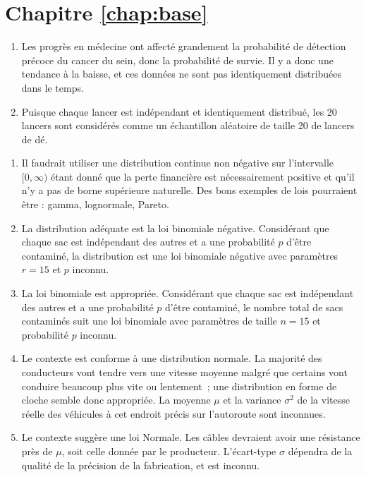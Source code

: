 \section*{Chapitre \ref{chap:base}}

\begin{solution}{1.1}
\begin{enumerate}
\item Les progrès en médecine ont affecté grandement la probabilité de détection précoce du cancer du sein, donc la probabilité de survie. Il y a donc une tendance à la baisse, et ces données ne sont pas identiquement distribuées dans le temps.
\item Puisque chaque lancer est indépendant et identiquement distribué, les 20 lancers sont considérés comme un échantillon aléatoire de taille 20 de lancers de dé.
\end{enumerate}
\end{solution}
\begin{solution}{1.2}
\begin{enumerate}
\item Il faudrait utiliser une distribution continue non négative sur l'intervalle $[0,\infty)$ étant donné que la perte financière est nécessairement positive et qu'il n'y a pas de borne supérieure naturelle. Des bons exemples de lois pourraient être : gamma, lognormale, Pareto.

\item La distribution adéquate est la loi binomiale négative. Considérant que chaque sac est indépendant des autres et a une probabilité $p$ d'être contaminé, la distribution est une loi binomiale négative avec paramètres $r=15$ et $p$ inconnu.

\item La loi binomiale est appropriée. Considérant que chaque sac est indépendant des autres et a une probabilité $p$ d'être contaminé, le nombre total de sacs contaminés suit une loi binomiale avec paramètres de taille $n=15$ et probabilité $p$ inconnu.

\item Le contexte est conforme à une distribution normale. La majorité des conducteurs vont tendre vers une vitesse moyenne malgré que certains vont conduire beaucoup plus vite ou lentement~; une distribution en forme de cloche semble donc appropriée. La moyenne $\mu$ et la variance $\sigma^2$ de la vitesse réelle des véhicules à cet endroit précis sur l'autoroute sont inconnues.

\item Le contexte suggère une loi Normale. Les câbles devraient avoir une résistance près de $\mu$, soit celle donnée par le producteur. L'écart-type $\sigma$ dépendra de la qualité de la précision de la fabrication, et est inconnu.
\end{enumerate}
\end{solution}
